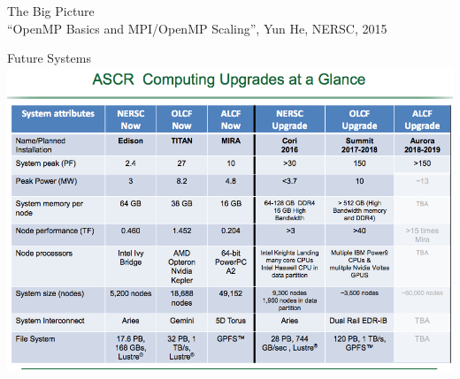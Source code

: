\begin{frame}{The Big Picture}
   \\
  {\scriptsize ``OpenMP Basics and MPI/OpenMP Scaling'', Yun He, NERSC, 2015}  
\end{frame}

\begin{frame}{Future Systems}
  \includegraphics[width=1.0\textwidth]{figures/ASCR-Upgrades.png}
\end{frame}


